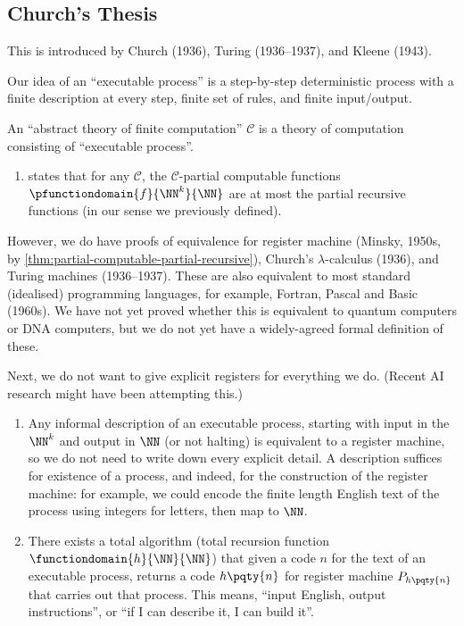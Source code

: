 \subsection{Church's Thesis}

This is introduced by Church (1936), Turing (1936--1937), and Kleene (1943).

Our idea of an ``executable process'' is a step-by-step deterministic process with a finite description at every step, finite set of rules, and finite input/output.

An ``abstract theory of finite computation'' \(\mathcal{C}\) is a theory of computation consisting of ``executable process''.

\begin{enumerate}
    \item {} states that for any \(\mathcal{C}\), the \(\mathcal{C}\)-partial computable functions \(\pfunctiondomain{f}{\NN^k}{\NN}\) are at most the partial recursive functions (in our sense we previously defined).
\end{enumerate}

However, we do have proofs of equivalence for register machine (Minsky, 1950s, by \autoref{thm:partial-computable-partial-recursive}), Church's \(\lambda\)-calculus (1936), and Turing machines (1936--1937). These are also equivalent to most standard (idealised) programming languages, for example, Fortran, Pascal and Basic (1960s). We have not yet proved whether this is equivalent to quantum computers or DNA computers, but we do not yet have a widely-agreed formal definition of these.

Next, we do not want to give explicit registers for everything we do. (Recent AI research might have been attempting this.)

\begin{enumerate}[resume]
    \item Any informal description of an executable process, starting with input in the \(\NN^k\) and output in \(\NN\) (or not halting) is equivalent to a register machine, so we do not need to write down every explicit detail. A description suffices for existence of a process, and indeed, for the construction of the register machine: for example, we could encode the finite length English text of the process using integers for letters, then map to \(\NN\).
    \item There exists a total algorithm (total recursion function \(\functiondomain{h}{\NN}{\NN}\)) that given a code \(n\) for the text of an executable process, returns a code \(h\pqty{n}\) for register machine \(P_{h\pqty{n}}\) that carries out that process. This means, ``input English, output instructions'', or ``if I can describe it, I can build it''.
\end{enumerate}

